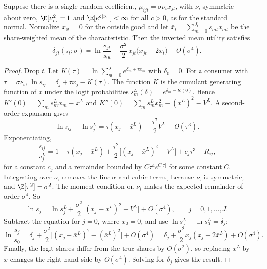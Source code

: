 \begin{proposition}\label{prop:08-smallsigma}
Suppose there is a single random coefficient, $\mu_{ijt} = \sigma\nu_i x_{jt}$, with $\nu_i$ symmetric
about zero, $\E[\nu_i^2] = 1$ and $\E[e^{c|\nu_i|}] < \infty$ for all $c > 0$, as for the standard normal. Normalize $x_{0t} = 0$ for the outside good and let
$\bar x_t = \sum_{m=0}^{J_t} s_{mt}x_{mt}$ be the share-weighted mean of the characteristic. Then the inverted
mean utility satisfies
\begin{equation*}
  \delta_{jt}(s_t;\sigma) = \ln\frac{s_{jt}}{s_{0t}} - \frac{\sigma^2}{2}\,x_{jt}\big(x_{jt} - 2\bar x_t\big)
  + O(\sigma^4).
\end{equation*}
\end{proposition}

\begin{proof}
Drop $t$. Let $K(\tau) = \ln\sum_{m=0}^{J}e^{\delta_m + \tau x_m}$ with $\delta_0 = 0$. For a consumer with
$\tau = \sigma\nu_i$, $\ln s_{ij} = \delta_j + \tau x_j - K(\tau)$. The function $K$ is the cumulant generating
function of $x$ under the logit probabilities $s^L_m(\delta) = e^{\delta_m - K(0)}$. Hence $K'(0) = \sum_m
s^L_m x_m \equiv \bar x^L$ and $K''(0) = \sum_m s^L_m x_m^2 - (\bar x^L)^2 \equiv V^L$. A second-order
expansion gives
\begin{equation*}
  \ln s_{ij} - \ln s^L_j = \tau(x_j - \bar x^L) - \frac{\tau^2}{2}V^L + O(\tau^3).
\end{equation*}
Exponentiating,
\begin{equation*}
  \frac{s_{ij}}{s^L_j} = 1 + \tau(x_j - \bar x^L) + \frac{\tau^2}{2}\big[(x_j - \bar x^L)^2 - V^L\big] +
  c_j\tau^3 + R_{ij},
\end{equation*}
for a constant $c_j$ and a remainder bounded by $C\tau^4e^{C|\tau|}$ for some constant $C$. Integrating over
$\nu_i$ removes the linear and cubic terms, because $\nu_i$ is symmetric, and $\E[\tau^2] = \sigma^2$. The
moment condition on $\nu_i$ makes the expected remainder of order $\sigma^4$. So
\begin{equation*}
  \ln s_j = \ln s^L_j + \frac{\sigma^2}{2}\big[(x_j - \bar x^L)^2 - V^L\big] + O(\sigma^4), \qquad
  j = 0, 1, \dots, J.
\end{equation*}
Subtract the equation for $j = 0$, where $x_0 = 0$, and use $\ln s^L_j - \ln s^L_0 = \delta_j$:
\begin{equation*}
  \ln\frac{s_j}{s_0} = \delta_j + \frac{\sigma^2}{2}\big[(x_j - \bar x^L)^2 - (\bar x^L)^2\big] + O(\sigma^4)
  = \delta_j + \frac{\sigma^2}{2}x_j(x_j - 2\bar x^L) + O(\sigma^4).
\end{equation*}
Finally, the logit shares differ from the true shares by $O(\sigma^2)$, so replacing $\bar x^L$ by $\bar x$
changes the right-hand side by $O(\sigma^4)$. Solving for $\delta_j$ gives the result.
\end{proof}

